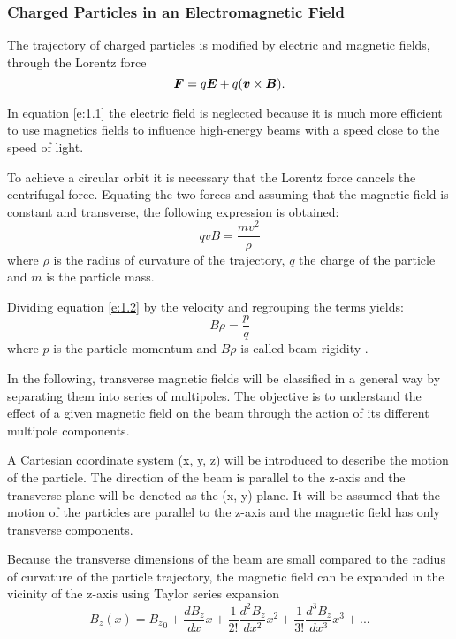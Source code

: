 \subsubsection{Charged Particles in an Electromagnetic Field} %

The trajectory of charged particles is modified by electric and magnetic fields, through the Lorentz force
\begin{equation} \label{e:1.1}
  \bm{F} = q\bm{E} + q(\bm{v}\times\bm{B}).
\end{equation}

In equation \ref{e:1.1} the electric field is neglected because it is much more efficient to use magnetics fields to influence high-energy beams with a speed close to the speed of light. 

To achieve a circular orbit it is necessary that the Lorentz force cancels the centrifugal force. Equating the two forces and assuming that the magnetic field is constant and  transverse, the following expression is obtained:
\begin{equation}\label{e:1.2}
  qvB = \frac{mv^2}{\rho}
\end{equation}
where $\rho$ is the radius of curvature of the trajectory, $q$ the charge of the particle  and $m$ is the particle mass.

Dividing equation \ref{e:1.2} by the velocity and regrouping the terms yields:
\begin{equation} \label{e:1.3}
  B\rho = \frac{p}{q}
\end{equation}
where $p$ is the particle momentum and $B\rho$ is called beam rigidity \cite{holzer2014}.

In the following, transverse magnetic fields will be classified in a general way by separating them into series of multipoles. The objective is to understand the effect of a given magnetic  field on the beam through the action of its different multipole components.

A Cartesian coordinate system (x, y, z) will be introduced to describe the motion of the particle. The direction of the beam is parallel to the z-axis and the transverse plane will be denoted as the (x, y) plane. It will be assumed that the motion of the particles  are parallel to the z-axis and the magnetic field has only transverse components. 

Because the transverse dimensions of the beam are small compared to the radius of curvature of the particle trajectory, the magnetic field can be expanded in the vicinity of the z-axis using Taylor series expansion
\begin{equation} \label{e:1.4}
  B_z(x) = {B_z}_0 + \frac{dB_z}{dx}x + \frac{1}{2!}\frac{d^2B_z}{dx^2}x^2 + \frac{1}{3!}\frac{d^3B_z}{dx^3}x^3 + ...
\end{equation}

